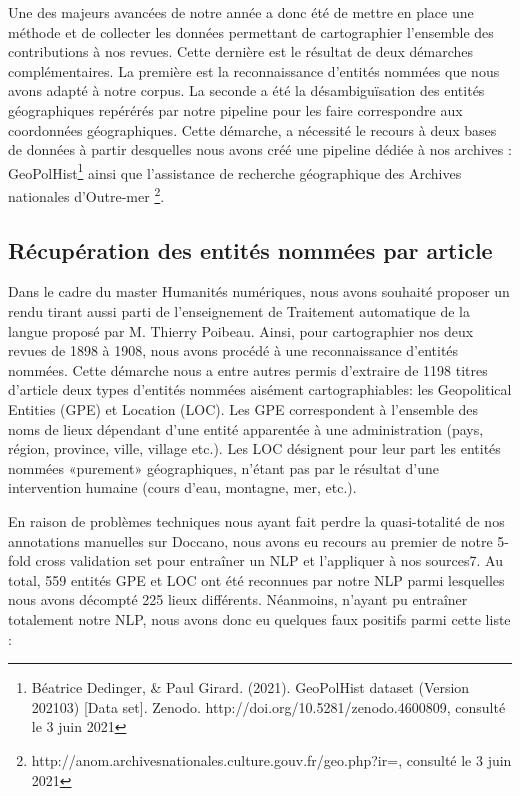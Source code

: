 Une des majeurs avancées de notre année a donc été de mettre en place une méthode et de collecter les données permettant de cartographier l'ensemble des contributions à nos revues. Cette dernière est le résultat de deux démarches complémentaires. La première est la reconnaissance d'entités nommées que nous avons adapté à notre corpus. La seconde a été la désambiguïsation des entités géographiques repérérés par notre pipeline pour les faire correspondre aux coordonnées géographiques. Cette démarche, a nécessité le recours à deux bases de données à partir desquelles nous avons créé une pipeline dédiée à nos archives : GeoPolHist\footnote{Béatrice Dedinger, \& Paul Girard. (2021). GeoPolHist dataset (Version 202103) [Data set]. Zenodo. http://doi.org/10.5281/zenodo.4600809, consulté le 3 juin 2021} ainsi que l'assistance de recherche géographique des Archives nationales d'Outre-mer \footnote{http://anom.archivesnationales.culture.gouv.fr/geo.php?ir=, consulté le 3 juin 2021}. 


\subsection{Récupération des entités nommées par article}
Dans le cadre du master Humanités numériques, nous avons souhaité proposer un rendu tirant aussi parti de l’enseignement de Traitement automatique de la langue proposé par M. Thierry Poibeau. Ainsi, pour cartographier nos deux revues de 1898 à 1908, nous avons procédé à une reconnaissance d’entités nommées. Cette démarche nous a entre autres permis d’extraire de 1198 titres d’article deux types d’entités nommées aisément cartographiables: les Geopolitical Entities (GPE) et Location (LOC). Les GPE correspondent à l’ensemble des noms de lieux dépendant d’une entité apparentée à une administration (pays, région, province, ville, village etc.). Les LOC désignent pour leur part les entités nommées «purement» géographiques, n’étant pas par le résultat d’une intervention humaine (cours d’eau, montagne, mer, etc.).

En raison de problèmes techniques nous ayant fait perdre la quasi-totalité de nos annotations manuelles sur Doccano, nous avons eu recours au premier de notre 5-fold cross validation set pour entraîner un NLP et l’appliquer à nos sources7. Au total, 559 entités GPE et LOC ont été reconnues par notre NLP parmi lesquelles nous avons décompté 225 lieux différents. Néanmoins, n’ayant pu entraîner totalement notre NLP, nous avons donc eu quelques faux positifs parmi cette liste :

